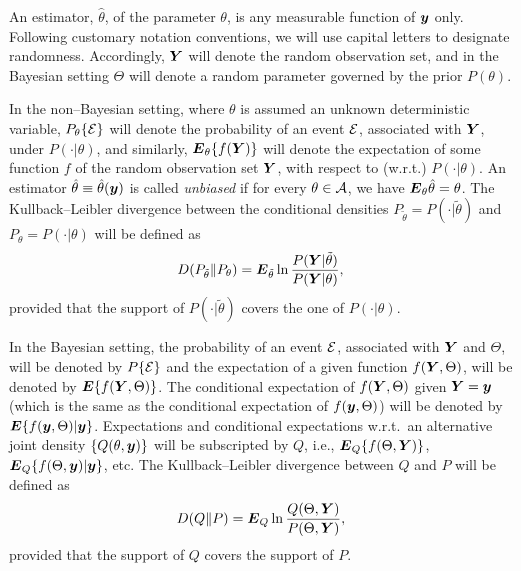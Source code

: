 \documentclass[11pt,epsf]{article}
\newcommand{\ttt}{\tilde{\theta}}
\newcommand{\ct}{\hat{\theta}}
\newcommand {\by} {\mbox{\boldmath $y$}}
\newcommand {\bE} {\mbox{\boldmath $E$}}
\newcommand {\bY} {\mbox{\boldmath $Y$}}
\newcommand{\calA}{{\cal A}}
\newcommand{\calE}{{\cal E}}
\begin{document}
An estimator, $\ct$, of the parameter
$\theta$, is any measurable function of
$\by$ only. Following customary notation conventions, we will use capital
letters to designate randomness. Accordingly, $\bY$ will denote the random
observation set, and in the Bayesian setting $\Theta$ will denote a random
parameter governed by the prior $P(\theta)$. 

In the non--Bayesian setting,
where $\theta$ is assumed an unknown deterministic variable,
$P_\theta\{\calE\}$ will denote the probability of an event
$\calE$, associated with $\bY$, under $P(\cdot|\theta)$, and similarly, $\bE_\theta\{f(\bY)\}$
will denote the expectation of some function $f$ of the random observation set
$\bY$, with respect to (w.r.t.) $P(\cdot|\theta)$. An estimator $\ct\equiv
\ct(\by)$ is
called {\it unbiased} if for every $\theta\in\calA$, we have $\bE_\theta\ct=\theta$.
The Kullback--Leibler divergence between the conditional densities
$P_{\ttt}=P(\cdot|\ttt)$ and $P_{\theta}=P(\cdot|\theta)$ will be defined as
\begin{equation}
D(P_{\ttt}\|P_\theta)=\bE_{\ttt}\ln\frac{P(\bY|\ttt)}{P(\bY|\theta)},
\end{equation}
provided that the support of $P(\cdot|\ttt)$ covers the one of
$P(\cdot|\theta)$.

In the Bayesian setting, the probability of an event $\calE$, associated with
$\bY$ and $\Theta$, will be denoted by
$P\{\calE\}$ and the expectation of a given function $f(\bY,\Theta)$, will be
denoted by $\bE\{f(\bY,\Theta)\}$. The conditional expectation of
$f(\bY,\Theta)$ given $\bY=\by$ (which is the same as the conditional
expectation of $f(\by,\Theta)$) will be denoted by $\bE\{f(\by,\Theta)|\by\}$.
Expectations and conditional expectations w.r.t.\ an alternative
joint density $\{Q(\theta,\by)\}$ will be subscripted by $Q$, i.e.,
$\bE_Q\{f(\Theta,\bY)\}$, $\bE_Q\{f(\Theta,\by)|\by\}$, etc.
The Kullback--Leibler divergence between
$Q$ and $P$ will be defined as
\begin{equation}
D(Q\|P)=\bE_Q\ln\frac{Q(\Theta,\bY)}{P(\Theta,\bY)},
\end{equation}
provided that the support of $Q$ covers the support of $P$.
\end{document}
